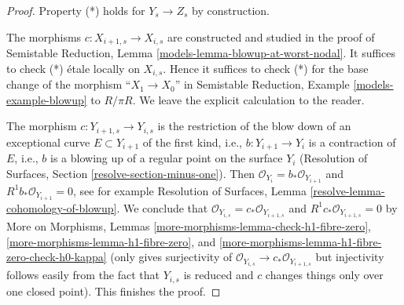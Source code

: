 \documentclass[10pt,a4paper]{amsart}
\theoremstyle{plain}
\theoremstyle{definition}
\theoremstyle{remark}
\numberwithin{equation}{subsection}
\begin{document}
\begin{proof}
\medskip\noindent
Property (*) holds for $Y_s \to Z_s$ by construction.

\medskip\noindent
The morphisms $c : X_{i + 1, s} \to X_{i, s}$ are constructed and studied
in the proof of
Semistable Reduction, Lemma \ref{models-lemma-blowup-at-worst-nodal}.
It suffices to check (*) \'etale locally on $X_{i, s}$.
Hence it suffices to check (*) for the base change of the morphism
``$X_1 \to X_0$'' in Semistable Reduction, Example \ref{models-example-blowup}
to $R/\pi R$.
We leave the explicit calculation to the reader.

\medskip\noindent
The morphism $c : Y_{i + 1, s} \to Y_{i, s}$ is the restriction
of the blow down of an exceptional curve $E \subset Y_{i + 1}$
of the first kind, i.e., $b : Y_{i + 1} \to Y_i$ is a contraction of $E$,
i.e., $b$ is a blowing up of a regular point on the surface $Y_i$
(Resolution of Surfaces, Section \ref{resolve-section-minus-one}).
Then $\mathcal{O}_{Y_i} = b_*\mathcal{O}_{Y_{i + 1}}$ and
$R^1b_*\mathcal{O}_{Y_{i + 1}} = 0$, see for example
Resolution of Surfaces, Lemma
\ref{resolve-lemma-cohomology-of-blowup}.
We conclude that $\mathcal{O}_{Y_{i, s}} = c_*\mathcal{O}_{Y_{i + 1, s}}$
and $R^1c_*\mathcal{O}_{Y_{i + 1, s}} = 0$ by
More on Morphisms, Lemmas \ref{more-morphisms-lemma-check-h1-fibre-zero},
\ref{more-morphisms-lemma-h1-fibre-zero}, and
\ref{more-morphisms-lemma-h1-fibre-zero-check-h0-kappa}
(only gives surjectivity of
$\mathcal{O}_{Y_{i, s}} \to c_*\mathcal{O}_{Y_{i + 1, s}}$ but
injectivity follows easily from the fact that $Y_{i, s}$ is reduced
and $c$ changes things only over one closed point).
This finishes the proof.
\end{proof}
\end{document}
